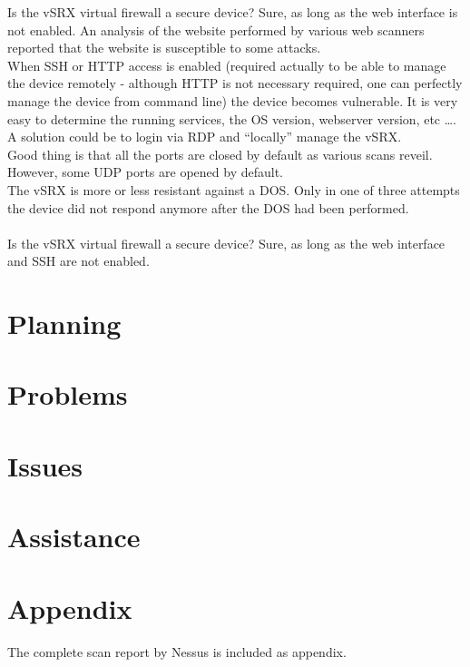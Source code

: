 \documentclass[11pt, a4paper]{article}
\begin{document}
Is the vSRX virtual firewall a secure device? Sure, as long as the web interface is not enabled. An analysis of the website performed by various web scanners reported that the website is susceptible to some attacks. \\
 When SSH or HTTP access is enabled (required actually to be able to manage the device remotely - although HTTP is not necessary required, one can perfectly manage the device from command line) the device becomes vulnerable. It is very easy to determine the running services, the OS version, webserver version, etc \ldots. A solution could be to login via RDP and ``locally'' manage the vSRX. \\
Good thing is that all the ports are closed by default as various scans reveil. However, some UDP ports are opened by default. \\
The vSRX is more or less resistant against a DOS. Only in one of three attempts the device did not respond anymore after the DOS had been performed. \\ \\
Is the vSRX virtual firewall a secure device? Sure, as long as the web interface and SSH are not enabled.

\section*{Planning}



\section*{Problems}



\section*{Issues}



\section*{Assistance}

\newpage

\section*{Appendix}

The complete scan report by Nessus is included as appendix.



\newpage



\end{document}
